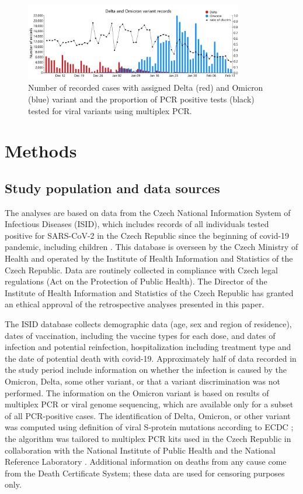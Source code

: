 \documentclass[9pt,twocolumn,twoside,lineno]{pnas-new}
\begin{document}
\begin{figure}
\centering
\includegraphics[width=0.85\textwidth]{fig1.pdf}
\caption{Number of recorded cases with assigned Delta (red) and Omicron (blue) variant and the proportion of PCR positive tests (black) tested for viral variants using multiplex PCR.}
\label{fig:discrim}
\end{figure}

\section*{Methods}
\label{sec2}

\subsection*{Study population and data sources}

The analyses are based on data from the Czech National Information System of Infectious Diseases (ISID), which includes records of all individuals tested positive for SARS-CoV-2 in the Czech Republic since the beginning of covid-19 pandemic, including children \citep{komenda2020}. This database is overseen by the Czech Ministry of Health and operated by the Institute of Health Information and Statistics of the Czech Republic. Data are routinely collected in compliance with Czech legal regulations (Act on the Protection of Public Health). The Director of the Institute of Health Information and Statistics of the Czech Republic has granted an ethical approval of the retrospective analyses presented in this paper.

The ISID database collects demographic data (age, sex and region of residence), dates of vaccination, including the vaccine types for each dose, and dates of infection and potential reinfection, hospitalization including treatment type and the date of potential death with covid-19. Approximately half of data recorded in the study period include information on whether the infection is caused by the Omicron, Delta, some other variant, or that a variant discrimination was not performed. The information on the Omicron variant is based on results of multiplex PCR or viral genome sequencing, which are available only for a subset of all PCR-positive cases. The identification of Delta, Omicron, or other variant was computed using definition of viral S-protein mutations according to ECDC \citep{ECDC_var_concern}; the algorithm was tailored to multiplex PCR kits used in the Czech Republic in collaboration with the National Institute of Public Health and the National Reference Laboratory \citep{SZU_zprava}. Additional information on deaths from any cause come from the Death Certificate System; these data are used for censoring purposes only.
\end{document}
